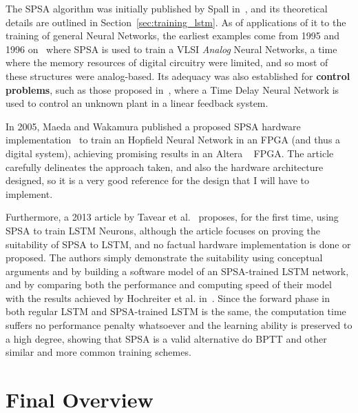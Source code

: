 The SPSA algorithm was initially published by Spall in~\cite{Spall98}, and its theoretical details are outlined in Section~\ref{sec:training_lstm}. As of applications of it to the training of general Neural Networks, the earliest examples come from 1995 and 1996 on~\cite{Maeda95, Cauwen96} where SPSA is used to train a VLSI \emph{Analog} Neural Networks, a time where the memory resources of digital circuitry were limited, and so most of these structures were analog-based. Its adequacy was also established for \textbf{control problems}, such as those proposed in~\cite{Figueiredo97}, where a Time Delay Neural Network is used to control an unknown plant in a linear feedback system.

In 2005, Maeda and Wakamura published a proposed SPSA hardware implementation~\cite{Maeda05} to train an Hopfield Neural Network in an FPGA (and thus a digital system), achieving promising results in an Altera \textregistered~ FPGA. The article carefully delineates the approach taken, and also the hardware architecture designed, so it is a very good reference for the design that I will have to implement. 

Furthermore, a 2013 article by Tavear et al.~\cite{Tavear13} proposes, for the first time, using SPSA to train LSTM Neurons, although the article focuses on proving the suitability of SPSA to LSTM, and no factual hardware implementation is done or proposed. The authors simply demonstrate the suitability using conceptual arguments and by building a software model of an SPSA-trained LSTM network, and by comparing both the performance and computing speed of their model with the results achieved by Hochreiter et al. in~\cite{Hochreiter07}. Since the forward phase in both regular LSTM and SPSA-trained LSTM is the same, the computation time suffers no performance penalty whatsoever and the learning ability is preserved to a high degree, showing that SPSA is a valid alternative do BPTT and other similar and more common training schemes.

\section{Final Overview}\label{sec:overview}

